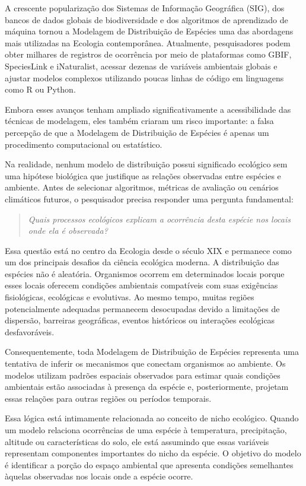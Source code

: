 A crescente popularização dos Sistemas de Informação Geográfica (SIG), dos bancos de dados globais de biodiversidade e dos algoritmos de aprendizado de máquina tornou a Modelagem de Distribuição de Espécies uma das abordagens mais utilizadas na Ecologia contemporânea. Atualmente, pesquisadores podem obter milhares de registros de ocorrência por meio de plataformas como GBIF, SpeciesLink e iNaturalist, acessar dezenas de variáveis ambientais globais e ajustar modelos complexos utilizando poucas linhas de código em linguagens como R ou Python.

Embora esses avanços tenham ampliado significativamente a acessibilidade das técnicas de modelagem, eles também criaram um risco importante: a falsa percepção de que a Modelagem de Distribuição de Espécies é apenas um procedimento computacional ou estatístico.

Na realidade, nenhum modelo de distribuição possui significado ecológico sem uma hipótese biológica que justifique as relações observadas entre espécies e ambiente. Antes de selecionar algoritmos, métricas de avaliação ou cenários climáticos futuros, o pesquisador precisa responder uma pergunta fundamental:

\begin{quote}
	\textit{Quais processos ecológicos explicam a ocorrência desta espécie nos locais onde ela é observada?}
\end{quote}

Essa questão está no centro da Ecologia desde o século XIX e permanece como um dos principais desafios da ciência ecológica moderna. A distribuição das espécies não é aleatória. Organismos ocorrem em determinados locais porque esses locais oferecem condições ambientais compatíveis com suas exigências fisiológicas, ecológicas e evolutivas. Ao mesmo tempo, muitas regiões potencialmente adequadas permanecem desocupadas devido a limitações de dispersão, barreiras geográficas, eventos históricos ou interações ecológicas desfavoráveis.

Consequentemente, toda Modelagem de Distribuição de Espécies representa uma tentativa de inferir os mecanismos que conectam organismos ao ambiente. Os modelos utilizam padrões espaciais observados para estimar quais condições ambientais estão associadas à presença da espécie e, posteriormente, projetam essas relações para outras regiões ou períodos temporais.

Essa lógica está intimamente relacionada ao conceito de nicho ecológico. Quando um modelo relaciona ocorrências de uma espécie à temperatura, precipitação, altitude ou características do solo, ele está assumindo que essas variáveis representam componentes importantes do nicho da espécie. O objetivo do modelo é identificar a porção do espaço ambiental que apresenta condições semelhantes àquelas observadas nos locais onde a espécie ocorre.

